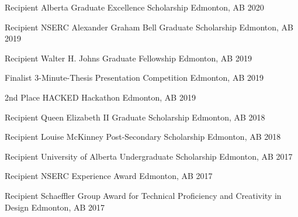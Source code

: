 
\begin{cvhonors}

  \cvhonor
    {Recipient} %
    {Alberta Graduate Excellence Scholarship} %
    {Edmonton, AB} %
    {2020} %

  \cvhonor
    {Recipient} %
    {NSERC Alexander Graham Bell Graduate Scholarship} %
    {Edmonton, AB} %
    {2019} %

  \cvhonor
    {Recipient} %
    {Walter H. Johns Graduate Fellowship} %
    {Edmonton, AB} %
    {2019} %

  \cvhonor
    {Finalist} %
    {3-Minute-Thesis Presentation Competition} %
    {Edmonton, AB} %
    {2019} %

  \cvhonor
    {2nd Place} %
    {HACKED Hackathon} %
    {Edmonton, AB} %
    {2019} %

  \cvhonor
  {Recipient} %
  {Queen Elizabeth II Graduate Scholarship} %
  {Edmonton, AB} %
  {2018} %

  \cvhonor
  {Recipient} %
  {Louise McKinney Post-Secondary Scholarship} %
  {Edmonton, AB} %
  {2018} %

  \cvhonor
  {Recipient} %
  {University of Alberta Undergraduate Scholarship} %
  {Edmonton, AB} %
  {2017} %

  \cvhonor
  {Recipient} %
  {NSERC Experience Award} %
  {Edmonton, AB} %
  {2017} %

  \cvhonor
  {Recipient}
  {Schaeffler Group Award for Technical Proficiency and Creativity in Design}
  {Edmonton, AB}
  {2017}

\end{cvhonors}